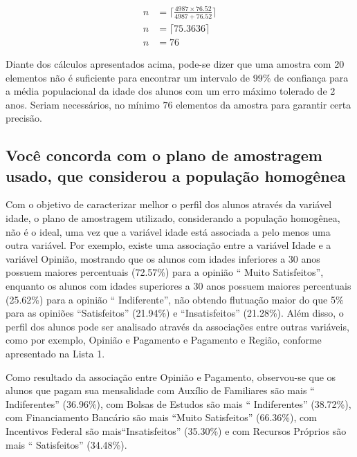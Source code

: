 	\begin{align*}
		n &= \Big\lceil \frac{4987 \times \num{76,52}}{4987 + \num{76,52}} \Big\rceil \\
		n &= \lceil \num{75,3636} \rceil \\
		n &= 76
	\end{align*}

	Diante dos cálculos apresentados acima, pode-se dizer que uma amostra
	com 20 elementos não é suficiente para encontrar um intervalo de 99\% de
	confiança para a média populacional da idade dos alunos com um erro
	máximo tolerado de 2 anos. Seriam necessários, no mínimo $76$ elementos da
	amostra para garantir certa precisão. 

\subsection{Você concorda com o plano de amostragem usado, que considerou a população homogênea}
	
	Com o objetivo de caracterizar melhor o perfil dos alunos através da
	variável idade, o plano de amostragem utilizado, considerando a
	população homogênea, não é o ideal, uma vez que a variável idade está
	associada a pelo menos uma outra variável. Por exemplo, existe uma
	associação entre a variável Idade e a variável Opinião, mostrando que os
	alunos com idades inferiores a 30 anos possuem maiores percentuais
	(\num{72,57}\%) para a opinião `` Muito Satisfeitos'', enquanto os 
    alunos com idades superiores
	a 30 anos possuem maiores percentuais (\num{25,62}\%) para a opinião
    `` Indiferente'', não obtendo flutuação
	maior do que 5\% para as opiniões ``Satisfeitos'' (\num{21,94}\%) 
    e ``Insatisfeitos'' (\num{21,28}\%). Além disso, o perfil dos
	alunos pode ser analisado através da associações entre outras variáveis,
	como por exemplo, Opinião e Pagamento e Pagamento e Região, conforme
	apresentado na Lista 1. 

	Como resultado da associação entre Opinião e Pagamento, observou-se que
	os alunos que pagam sua mensalidade com Auxílio de Familiares são mais
	`` Indiferentes'' (\num{36,96}\%), com Bolsas
	de Estudos são mais `` Indiferentes''
	(\num{38,72}\%), com Financiamento Bancário são mais ``Muito Satisfeitos''
    (\num{66,36}\%), com Incentivos Federal são mais``Insatisfeitos'' (\num{35,30}\%) e com
	Recursos Próprios são mais ``
	Satisfeitos'' (\num{34,48}\%).

